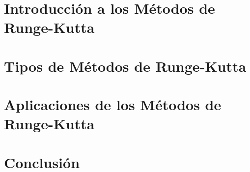 \documentclass[12pt, a4paper]{article}
\begin{document}
\section{Introducción a los Métodos de Runge-Kutta}

\section{Tipos de Métodos de Runge-Kutta}

\section{Aplicaciones de los Métodos de Runge-Kutta}

\section{Conclusión}
\end{document}

